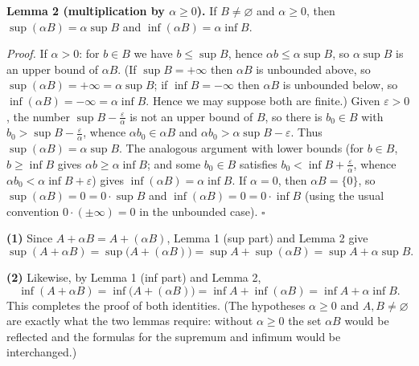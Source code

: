 \documentclass[11pt,a4paper]{article}
\newenvironment{solution}[1]{%
  \par\addvspace{1.7ex}%
  \noindent{\color{solutioncolor}\textbf{#1}}\hspace{0.55em}\ignorespaces}%
  {\par\addvspace{0.9ex}}
\begin{document}
\begin{solution}{Solution 2.4.8}
\medskip
\noindent\textbf{Lemma 2 (multiplication by $\alpha \ge 0$).} If $B \ne \varnothing$ and $\alpha \ge 0$, then $\sup(\alpha B) = \alpha \sup B$ and $\inf(\alpha B) = \alpha \inf B$.

\emph{Proof.} If $\alpha > 0$: for $b \in B$ we have $b \le \sup B$, hence $\alpha b \le \alpha \sup B$, so $\alpha \sup B$ is an upper bound of $\alpha B$. (If $\sup B = +\infty$ then $\alpha B$ is unbounded above, so $\sup(\alpha B) = +\infty = \alpha \sup B$; if $\inf B = -\infty$ then $\alpha B$ is unbounded below, so $\inf(\alpha B) = -\infty = \alpha \inf B$. Hence we may suppose both are finite.) Given $\varepsilon > 0$, the number $\sup B - \frac{\varepsilon}{\alpha}$ is not an upper bound of $B$, so there is $b_0 \in B$ with $b_0 > \sup B - \frac{\varepsilon}{\alpha}$, whence $\alpha b_0 \in \alpha B$ and $\alpha b_0 > \alpha \sup B - \varepsilon$. Thus $\sup(\alpha B) = \alpha \sup B$. The analogous argument with lower bounds (for $b \in B$, $b \ge \inf B$ gives $\alpha b \ge \alpha \inf B$; and some $b_0 \in B$ satisfies $b_0 < \inf B + \frac{\varepsilon}{\alpha}$, whence $\alpha b_0 < \alpha \inf B + \varepsilon$) gives $\inf(\alpha B) = \alpha \inf B$. If $\alpha = 0$, then $\alpha B = \{0\}$, so $\sup(\alpha B) = 0 = 0 \cdot \sup B$ and $\inf(\alpha B) = 0 = 0 \cdot \inf B$ (using the usual convention $0 \cdot (\pm\infty) = 0$ in the unbounded case). $\square$

\medskip
\noindent\textbf{(1)} Since $A + \alpha B = A + (\alpha B)$, Lemma 1 (sup part) and Lemma 2 give
\[
\sup(A + \alpha B) = \sup\bigl(A + (\alpha B)\bigr) = \sup A + \sup(\alpha B) = \sup A + \alpha \sup B .
\]

\medskip
\noindent\textbf{(2)} Likewise, by Lemma 1 (inf part) and Lemma 2,
\[
\inf(A + \alpha B) = \inf\bigl(A + (\alpha B)\bigr) = \inf A + \inf(\alpha B) = \inf A + \alpha \inf B .
\]
This completes the proof of both identities. (The hypotheses $\alpha \ge 0$ and $A, B \ne \varnothing$ are exactly what the two lemmas require: without $\alpha \ge 0$ the set $\alpha B$ would be reflected and the formulas for the supremum and infimum would be interchanged.)
\end{solution}
\end{document}

